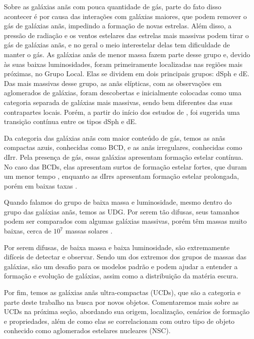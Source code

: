 Sobre as galáxias anãs com pouca quantidade de gás, parte do fato disso acontecer é por causa das interações com galáxias maiores, que podem remover o gás de galáxias anãs, impedindo a formação de novas estrelas. Além disso, a pressão de radiação e os ventos estelares das estrelas mais massivas podem tirar o gás de galáxias anãs, e no geral o meio interestelar delas tem dificuldade de manter o gás. As galáxias anãs de menor massa fazem parte desse grupo e, devido às suas baixas luminosidades, foram primeiramente localizadas nas regiões mais próximas, no Grupo Local. Elas se dividem em dois principais grupos: \ac{dSph} e \ac{dE}. Das mais massivas desse grupo, as anãs elípticas, com as observações em aglomerados de galáxias, foram descobertas e inicialmente colocadas como uma categoria separada de galáxias mais massivas, sendo bem diferentes das suas contrapartes locais. Porém, a partir do início dos estudos de \cite{Forbes_2011}, foi sugerida uma transição contínua entre os tipos \ac{dSph} e \ac{dE}.

Da categoria das galáxias anãs com maior conteúdo de gás, temos as anãs compactas azuis, conhecidas como \ac{BCD}, e as anãs irregulares, conhecidas como \ac{dIrr}. Pela presença de gás, essas galáxias apresentam formação estelar contínua. No caso das BCDs, elas apresentam surtos de formação estelar fortes, que duram um menor tempo \citep{Thornley2000}, enquanto as dIrrs apresentam formação estelar prolongada, porém em baixas taxas \citep{McQuinn2010}.

Quando falamos do grupo de baixa massa e luminosidade, mesmo dentro do grupo das galáxias anãs, temos as \ac{UDG}. Por serem tão difusas, seus tamanhos podem ser comparados com algumas galáxias massivas, porém têm massas muito baixas, cerca de $10^7$ massas solares \citep{van_Dokkum2015}. 

Por serem difusas, de baixa massa e baixa luminosidade, são extremamente difíceis de detectar e observar. Sendo um dos extremos dos grupos de massas das galáxias, são um desafio para os modelos padrão e podem ajudar a entender a formação e evolução de galáxias, assim como a distribuição da matéria escura.

Por fim, temos as galáxias anãs ultra-compactas (UCDs), que são a categoria e parte deste trabalho na busca por novos objetos. Comentaremos mais sobre as UCDs na próxima seção, abordando sua origem, localização, cenários de formação e propriedades, além de como elas se correlacionam com outro tipo de objeto conhecido como aglomerados estelares nucleares (\ac{NSC}).

